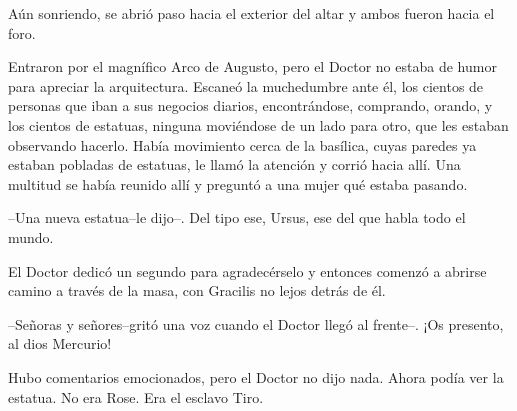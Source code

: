 Aún sonriendo, se abrió paso hacia el exterior del altar y ambos fueron
hacia el foro.

Entraron por el magnífico Arco de Augusto, pero el Doctor no estaba de
humor para apreciar la arquitectura. Escaneó la muchedumbre ante él, los
cientos de personas que iban a sus negocios diarios, encontrándose,
comprando, orando, y los cientos de estatuas, ninguna moviéndose de un
lado para otro, que les estaban observando hacerlo. Había movimiento
cerca de la basílica, cuyas paredes ya estaban pobladas de estatuas, le
llamó la atención y corrió hacia allí. Una multitud se había reunido
allí y preguntó a una mujer qué estaba pasando.

--Una nueva estatua--le dijo--. Del tipo ese, Ursus, ese del que habla
todo el mundo.

El Doctor dedicó un segundo para agradecérselo y entonces comenzó a
abrirse camino a través de la masa, con Gracilis no lejos detrás de él.

--Señoras y señores--gritó una voz cuando el Doctor llegó al frente--.
¡Os presento, al dios Mercurio!

Hubo comentarios emocionados, pero el Doctor no dijo nada. Ahora podía
ver la estatua. No era Rose. Era el esclavo Tiro.
